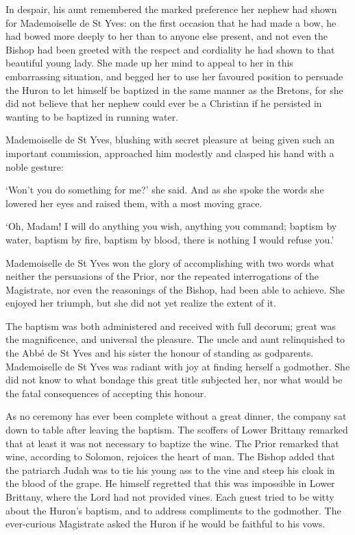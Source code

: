 \documentclass{article}
\begin{document}
\begin{center}
In despair, his aunt remembered the marked preference her nephew had shown for 
Mademoiselle de St Yves: on the first occasion that he had made a bow, he had bowed 
more deeply to her than to anyone else present, and not even the Bishop had been 
greeted with the respect and cordiality he had shown to that beautiful young lady. 
She made up her mind to appeal to her in this embarrassing situation, and begged 
her to use her favoured position to persuade the Huron to let himself be baptized 
in the same manner as the Bretons, for she did not believe that her nephew could 
ever be a Christian if he persisted in wanting to be baptized in running water. 

Mademoiselle de St Yves, blushing with secret pleasure at being given such an important 
commission, approached him modestly and clasped his hand with a noble gesture: 

`Won't you do something for me?' she said. And as she spoke the words she lowered 
her eyes and raised them, with a most moving grace. 

`Oh, Madam! I will do anything you wish, anything you command; baptism by water, 
baptism by fire, baptism by blood, there is nothing I would refuse you.' 

Mademoiselle de St Yves won the glory of accomplishing with two words what neither 
the persuasions of the Prior, nor the repeated interrogations of the Magistrate, 
nor even the reasonings of the Bishop, had been able to achieve. She enjoyed her 
triumph, but she did not yet realize the extent of it. 

The baptism was both administered and received with full decorum; great was the 
magnificence, and universal the pleasure. The uncle and aunt relinquished to the 
Abbé de St Yves and his sister the honour of standing as godparents. Mademoiselle 
de St Yves was radiant with joy at finding herself a godmother. She did not know 
to what bondage this great title subjected her, nor what would be the fatal consequences 
of accepting this honour. 

As no ceremony has ever been complete without a great dinner, the company sat down 
to table after leaving the baptism. The scoffers of Lower Brittany remarked that 
at least it was not necessary to baptize the wine. The Prior remarked that wine, 
according to Solomon, rejoices the heart of man. The Bishop added that the patriarch 
Judah was to tie his young ass to the vine and steep his cloak in the blood of 
the grape. He himself regretted that this was impossible in Lower Brittany, where 
the Lord had not provided vines. Each guest tried to be witty about the Huron's 
baptism, and to address compliments to the godmother. The ever-curious Magistrate 
asked the Huron if he would be faithful to his vows. 


\end{center}
\end{document}
